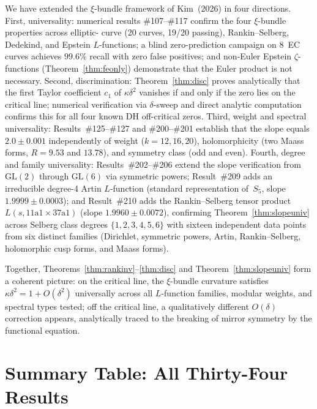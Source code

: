 \documentclass[11pt, a4paper]{article}
\theoremstyle{plain}
\theoremstyle{definition}
\begin{document}
We have extended the $\xi$-bundle framework of Kim~(2026) in four
directions.  First, universality: numerical results
\#107--\#117 confirm the four $\xi$-bundle properties across elliptic-
curve (20 curves, 19/20 passing), Rankin--Selberg, Dedekind, and
Epstein $L$-functions; a blind zero-prediction campaign on 8~EC curves
achieves $99.6\%$ recall with zero false positives; and non-Euler
Epstein $\zeta$-functions (Theorem~\ref{thm:feonly}) demonstrate that the Euler
product is not necessary.  Second, discrimination:
Theorem~\ref{thm:disc} proves analytically that the first Taylor coefficient
$c_{1}$ of $\kappa\delta^{2}$ vanishes if and only if the zero lies on
the critical line; numerical verification via $\delta$-sweep and direct
analytic computation confirms this for all four known DH off-critical
zeros.  Third, weight and spectral universality: Results~\#125--\#127
and \#200--\#201 establish that the slope equals $2.0\pm 0.001$
independently of weight ($k=12,16,20$), holomorphicity (two Maass forms,
$R=9.53$ and $13.78$), and symmetry class (odd and even).
Fourth, degree and family universality: Results~\#202--\#206 extend the slope
verification from $\mathrm{GL}(2)$ through $\mathrm{GL}(6)$
via symmetric powers; Result~\#209 adds an irreducible degree-4
Artin $L$-function (standard representation of~$S_5$, slope
$1.9999\pm 0.0003$); and Result~\#210 adds the Rankin--Selberg
tensor product $L(s,\text{11a1}\times\text{37a1})$ (slope
$1.9960\pm 0.0072$), confirming Theorem~\ref{thm:slopeuniv} across Selberg class
degrees $\{1,2,3,4,5,6\}$ with sixteen independent data points from
six distinct families (Dirichlet, symmetric powers, Artin, Rankin--Selberg,
holomorphic cusp forms, and Maass forms).

Together, Theorems~\ref{thm:rankinv}--\ref{thm:disc} and Theorem~\ref{thm:slopeuniv} form a coherent picture:
on the critical line, the $\xi$-bundle curvature satisfies
$\kappa\delta^{2}=1+O(\delta^{2})$ universally across all $L$-function
families, modular weights, and spectral types tested; off the critical
line, a qualitatively different $O(\delta)$ correction appears,
analytically traced to the breaking of mirror symmetry by the functional
equation.


\appendix

\section{Summary Table: All Thirty-Four Results}
\label{app:summary}
\end{document}
